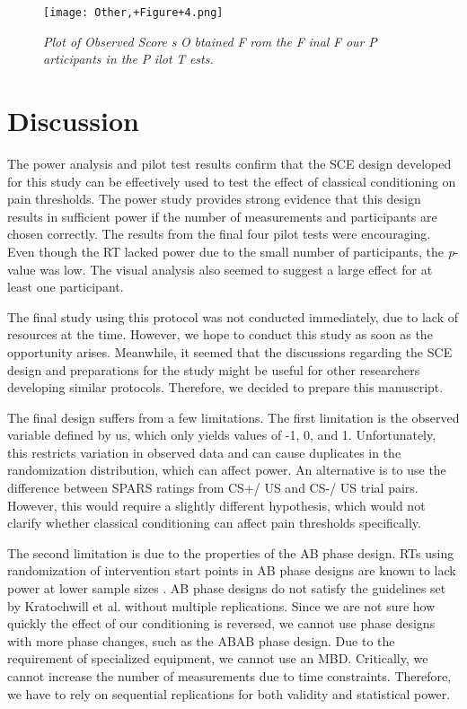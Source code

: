 \documentclass{article}
\begin{document}
  \begin{figure}

  \texttt{[image: Other,+Figure+4.png]}
\caption{\emph{Plot of }\emph{Observed Score} \emph{s }\emph{O} \emph{btained }\emph{F} \emph{rom} \emph{the }\emph{F} \emph{inal }\emph{F} \emph{our }\emph{P} \emph{articipants in the }\emph{P} \emph{ilot }\emph{T} \emph{ests.}}
\label{Figure 4}


\end{figure}
\section{Discussion}

The power analysis and pilot test results confirm that the SCE design developed for this study can be effectively used to test the effect of classical conditioning on pain thresholds. The power study provides strong evidence that this design results in sufficient power if the number of measurements and participants are chosen correctly. The results from the final four pilot tests were encouraging. Even though the RT lacked power due to the small number of participants, the \emph{p}-value was low. The visual analysis also seemed to suggest a large effect for at least one participant.

The final study using this protocol was not conducted immediately, due to lack of resources at the time. However, we hope to conduct this study as soon as the opportunity arises. Meanwhile, it seemed that the discussions regarding the SCE design and preparations for the study might be useful for other researchers developing similar protocols. Therefore, we decided to prepare this manuscript.

The final design suffers from a few limitations. The first limitation is the observed variable defined by us, which only yields values of -1, 0, and 1. Unfortunately, this restricts variation in observed data and can cause duplicates in the randomization distribution, which can affect power. An alternative is to use the difference between SPARS ratings from CS+/ US and CS-/ US trial pairs. However, this would require a slightly different hypothesis, which would not clarify whether classical conditioning can affect pain thresholds specifically.

The second limitation is due to the properties of the AB phase design. RTs using randomization of intervention start points in AB phase designs are known to lack power at lower sample sizes \autocite{bib46}. AB phase designs do not satisfy the guidelines set by Kratochwill et al. \autocite{bib26} without multiple replications. Since we are not sure how quickly the effect of our conditioning is reversed, we cannot use phase designs with more phase changes, such as the ABAB phase design. Due to the requirement of specialized equipment, we cannot use an MBD. Critically, we cannot increase the number of measurements due to time constraints. Therefore, we have to rely on sequential replications for both validity and statistical power.
\end{document}
